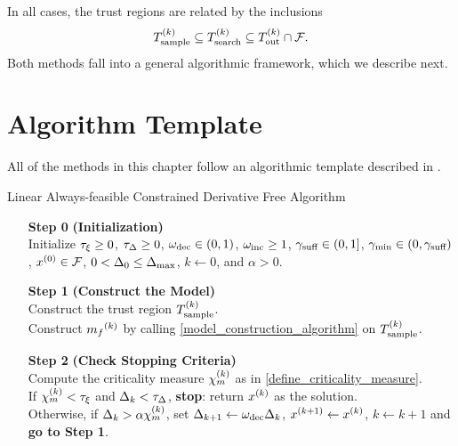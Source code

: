 In all cases, the trust regions are related by the inclusions
\begin{align*}
{T_{\text{sample}}^{(k)}} \subseteq {T_{\text{search}}^{(k)}} \subseteq {T_{\text{out}}^{(k)}} \cap {\mathcal F}.
\end{align*}
Both methods fall into a general algorithmic framework, which we describe next.


\section{Algorithm Template}\label{sec:template}

All of the methods in this chapter follow
an algorithmic template described in \cite{Conejo:2013:GCT:2620806.2621814}.


{
\begin{fullwidth}[leftmargin=0in, rightmargin=0in, width=\linewidth-0.25in]
\begin{flushleft}

\begin{algorithm}[H]
    \caption{Linear Always-feasible Constrained Derivative Free Algorithm}
    \label{linearly_constrained_dfo_simple}
    \begin{itemize}
        \item[\textbf{Step 0}] \textbf{(Initialization)} \\
            Initialize
            $\tau_{\xi}\ge 0$,
            $\tau_{\Delta} \ge 0$, 
            $\omega_{\text{dec}} \in (0,1)$, 
            $\omega_{\text{inc}} \ge 1$,  
            $ \gamma_{\textrm{suff}} \in (0,1]$, 
            $\gamma_{\textrm{min}} \in (0,\gamma_{\textrm{suff}})$, 
            $x^{(0)} \in {\mathcal F}$,
            $0 < \Delta_0 \le {\Delta_{\textrm{max}}}$,
            $k\gets 0$,
            and $\alpha > 0$.
            
        \item[\textbf{Step 1}] \textbf{(Construct the Model)} \\
           Construct the trust region ${T_{\text{sample}}^{(k)}}$. \\
           Construct ${{m}_f}^{(k)}$ by calling \cref{model_construction_algorithm} on ${T_{\text{sample}}^{(k)}}$.
        
        \item[\textbf{Step 2}] \textbf{(Check Stopping Criteria)} \\
            Compute the criticality measure ${\chi_m^{(k)}}$ as in \cref{define_criticality_measure}. \\
            If $ {\chi_m^{(k)}} < \tau_{\xi} $ and $\Delta_k <\tau_{\Delta}$,  {\bf stop}: return $x^{(k)}$ as the solution.   \\
            Otherwise, if $\Delta_k > \alpha {\chi_m^{(k)}}$,   
            set 
                $\Delta_{k+1} \gets \omega_{\text{dec}}\Delta_k$, 
                ${{x}^{(k+1)}} \gets x^{(k)}$,
                $k \gets k+1$ and {\bf go to Step 1}.
           

\end{itemize}
\end{algorithm}
\end{flushleft}
\end{fullwidth}}

